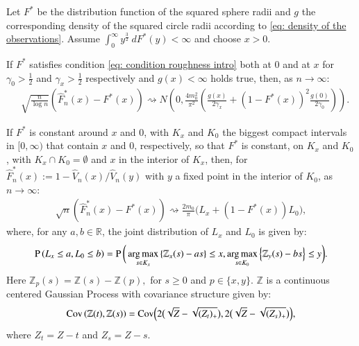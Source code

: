 \begin{theorem}\label{thm: main thm iso}
Let $F^*$ be the distribution function of the squared sphere radii and $g$ the corresponding density of the squared circle radii according to \eqref{eq: density of the observations}. Assume $\int_{0}^{\infty} y^{\frac{3}{2}} \: dF^*(y)  < \infty$ and choose $x >0$. 
\begin{thmlist}
    \item If $F^*$ satisfies condition \eqref{eq: condition roughness intro} both at $0$ and at $x$ for $\gamma_0 > \frac{1}{2}$ and $\gamma_x > \frac{1}{2}$ respectively and $g(x)<\infty$ holds true, then, as $n \rightarrow \infty$: \label{thm: main thm iso 1}
    \begin{align*}
    & \sqrt{\frac{n}{\log n}}\left( \hat{F}^*_n(x)-F^*(x)\right) \rightsquigarrow N\left(0, \frac{4m^2_0}{\pi^2} \left(\frac{g(x)}{2\gamma_x} + (1-F^*(x))^2 \frac{g(0)}{2\gamma_0} \right)\right).
    \end{align*} 
    \item If $F^*$ is constant around $x$ and $0$, with $K_x$ and $K_0$ the biggest compact intervals in $[0,\infty)$ that contain $x$ and $0$, respectively, so that $F^*$ is constant, on $K_x$ and $K_0$, with $K_x \cap K_0 = \emptyset$ and $x$ in the interior of $K_x$, then, for $\hat{F}^*_n(x) := 1 - \hat{V}_n(x)/\hat{V}_n(y)$ with $y$ a fixed point in the interior of $K_0$, as $n \rightarrow \infty$: \label{thm: main thm iso 2}
    \begin{align*}
        \sqrt{n} \left( \hat{F}^*_n(x) - F^*(x) \right) \rightsquigarrow \frac{2m_0}{\pi} \Big(L_x+ (1-F^*(x))L_0 \Big), 
    \end{align*}
    where, for any $a,b \in \mathbb{R}$, the joint distribution of $L_x$ and $L_0$ is given by:
    \begin{align*}
        \mathrm{P} \left( L_x \leq a, L_0 \leq b \right) = \mathrm{P} \, \bigg( \operatorname*{arg\,max}_{s \in K_x} \left\{ \mathbb{Z}_x(s) - a s\right\} \leq x, \operatorname*{arg\,max}_{s \in K_0} \left\{ \mathbb{Z}_y(s) - b s\right\} \leq y \bigg).
    \end{align*}
    Here $\mathbb{Z}_p(s) = \mathbb{Z}(s) - \mathbb{Z}(p),$ for $s \geq 0$ and $p \in \{x,y\}$. $\mathbb{Z}$ is a continuous centered Gaussian Process with covariance structure given by:
    \begin{align}\label{eq: covariance gauss process}
        \mathrm{Cov} \left( \mathbb{Z}(t),\mathbb{Z}(s) \right) = \mathrm{Cov} \Big( 2 \big( \sqrt{\smash[b]{Z}} - \sqrt{\smash[b]{(Z_t)_{+}}} \big), 2 \big( \sqrt{\smash[b]{Z}} - \sqrt{\smash[b]{(Z_s)_{+}}} \big) \Big),
    \end{align}
    where $Z_t = Z - t$ and $Z_s = Z - s$.
\end{thmlist}
\end{theorem}
  
